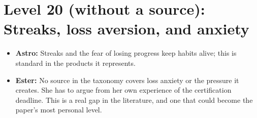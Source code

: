 \documentclass{article}
\begin{document}
\section{Level 20 (without a source): Streaks, loss aversion, and anxiety}
\begin{itemize}
  \item \textbf{Astro:} Streaks and the fear of losing progress keep habits alive; this is standard in the products it represents.
  \item \textbf{Ester:} No source in the taxonomy covers loss anxiety or the pressure it creates. She has to argue from her own experience of the certification deadline. This is a real gap in the literature, and one that could become the paper's most personal level.
\end{itemize}

\nocite{*}


\end{document}
